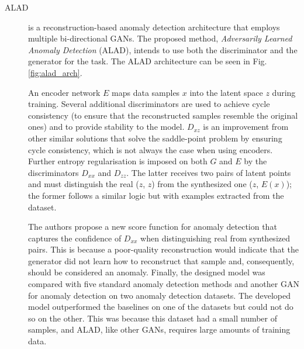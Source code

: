 \begin{description}
    \item[ALAD \cite{zenati.etal_AdversariallyLearnedAnomaly_2018}] is a reconstruction-based anomaly detection architecture that employs multiple bi-directional GANs. The proposed method, \textit{Adversarily Learned Anomaly Detection} (ALAD), intends to use both the discriminator and the generator for the task. The ALAD architecture can be seen in Fig. \ref{fig:alad_arch}.
    
    An encoder network $E$ maps data samples $x$ into the latent space $z$ during training. Several additional discriminators are used to achieve cycle consistency (to ensure that the reconstructed samples resemble the original ones) and to provide stability to the model. $D_{xz}$ is an improvement from other similar solutions that solve the saddle-point problem by ensuring cycle consistency, which is not always the case when using encoders. Further entropy regularisation is imposed on both $G$ and $E$ by the discriminators $D_{xx}$ and $D_{zz}$. The latter receives two pairs of latent points and must distinguish the real ($z$, $z$) from the synthesized one ($z$, $E(x)$); the former follows a similar logic but with examples extracted from the dataset. 
    
    The authors propose a new score function for anomaly detection that captures the confidence of $D_{xx}$ when distinguishing real from synthesized pairs. This is because a poor-quality reconstruction would indicate that the generator did not learn how to reconstruct that sample and, consequently, should be considered an anomaly. Finally, the designed model was compared with five standard anomaly detection methods and another GAN for anomaly detection on two anomaly detection datasets. The developed model outperformed the baselines on one of the datasets but could not do so on the other. This was because this dataset had a small number of samples, and ALAD, like other GANs, requires large amounts of training data.
\end{description}


